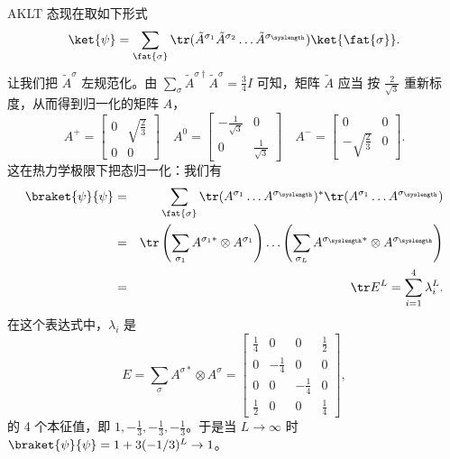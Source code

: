 AKLT 态现在取如下形式
\begin{equation}
    \ket{\psi} = \sum_{\fat{\sigma}} \tr (\tilde{A}^{\sigma_{1}} 
    \tilde{A}^{\sigma_{2}} \ldots \tilde{A}^{\sigma_{\syslength}}) \ket{\fat{\sigma}} .
    \label{eq:akltstate}
\end{equation}
让我们把 $\tilde{A}^\sigma$ 左规范化。由 $\sum_\sigma \tilde{A}^{\sigma\dagger}\tilde{A}^\sigma = \frac{3}{4}I$ 可知，矩阵 $\tilde{A}$  应当
按 $\frac{2}{\sqrt{3}}$ 重新标度，从而得到归一化的矩阵 $A$，
\begin{equation}
    A^+ = \left[ \begin{array}{cc} 0 & \sqrt{\frac{2}{3}} \\ 0 & 0 \end{array} \right] \quad
    A^0 = \left[ \begin{array}{cc} -\frac{1}{\sqrt{3}} & 0 \\ 
    0 & \frac{1}{\sqrt{3}} \end{array} \right] \quad
    A^- = \left[ \begin{array}{cc} 0 & 0 \\ -\sqrt{\frac{2}{3}} & 0 \end{array} \right] .
    \label{eq:normalizeda}
\end{equation}
这在热力学极限下把态归一化：我们有
\begin{eqnarray*}
\braket{\psi}{\psi} &=& \sum_{\fat{\sigma}} \tr (A^{\sigma_1} \ldots A^{\sigma_\syslength})^* \tr (A^{\sigma_1} \ldots A^{\sigma_\syslength}) \\
&=&  \tr \left( \sum_{\sigma_1} A^{\sigma_1*} \otimes A^{\sigma_1}\right) \ldots \left( \sum_{\sigma_L} A^{\sigma_\syslength*}\otimes A^{\sigma_\syslength} \right) \\
&=& \tr E^L = \sum_{i=1}^4 \lambda_i^L .
\end{eqnarray*}
在这个表达式中，$\lambda_i$ 是
\begin{equation}
E = \sum_\sigma A^{\sigma*} \otimes A^{\sigma} = \left[ \begin{array}{cccc} 
\frac{1}{4} & 0 & 0 & \frac{1}{2} \\
0 & -\frac{1}{4} & 0 & 0 \\
0 & 0 & -\frac{1}{4} & 0 \\
\frac{1}{2} & 0 & 0 & \frac{1}{4}
\end{array} \right] ,
\end{equation}
的 4 个本征值，即 $1,-\frac{1}{3},-\frac{1}{3},-\frac{1}{3}$。于是当 $L\rightarrow\infty$ 时 $\braket{\psi}{\psi} = 1 + 3(-1/3)^L \rightarrow 1$。

